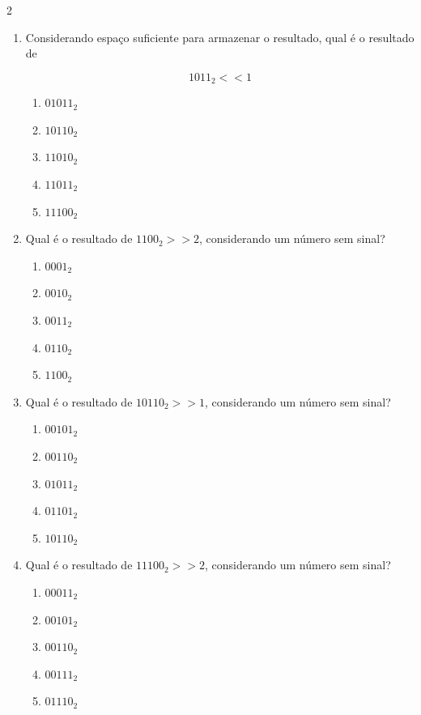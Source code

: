 \documentclass[a4paper,12pt]{article}
\begin{document}
\begin{multicols}{2}
\begin{enumerate}[leftmargin=*]
\item Considerando espaço suficiente para armazenar o resultado,
qual é o resultado de

\[
1011_2 << 1
\]

\begin{enumerate}[label=(\Alph*)]
    \item $01011_2$
    \item $10110_2$
    \item $11010_2$
    \item $11011_2$
    \item $11100_2$
\end{enumerate}

\vspace{0.2cm}



\item Qual é o resultado de
$1100_2 >> 2$,
considerando um número sem sinal?

\begin{enumerate}[label=(\Alph*)]
    \item $0001_2$
    \item $0010_2$
    \item $0011_2$
    \item $0110_2$
    \item $1100_2$
\end{enumerate}

\vspace{0.2cm}


\item Qual é o resultado de
$10110_2 >> 1$,
considerando um número sem sinal?

\begin{enumerate}[label=(\Alph*)]
    \item $00101_2$
    \item $00110_2$
    \item $01011_2$
    \item $01101_2$
    \item $10110_2$
\end{enumerate}

\vspace{0.2cm}


\item Qual é o resultado de
$11100_2 >> 2$,
considerando um número sem sinal?

\begin{enumerate}[label=(\Alph*)]
    \item $00011_2$
    \item $00101_2$
    \item $00110_2$
    \item $00111_2$
    \item $01110_2$
\end{enumerate}

\end{enumerate}

\end{multicols}
\end{document}
